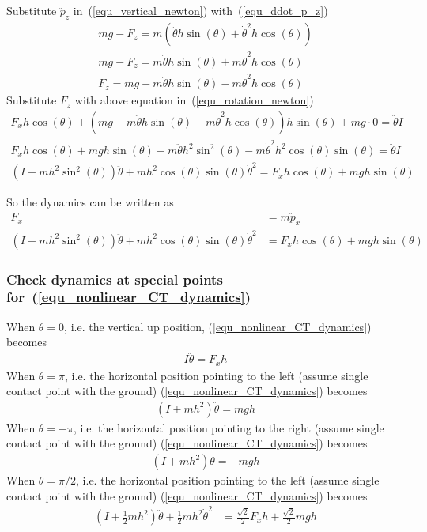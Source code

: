 \documentclass[12pt]{article}
\begin{document}
Substitute $\ddot{p}_z$ in~(\ref{equ_vertical_newton}) 
with~(\ref{equ_ddot_p_z})
\begin{align}
mg-F_z = m(\ddot{\theta}h\sin(\theta) + \dot{\theta}^2h\cos(\theta)) \\
mg-F_z = m\ddot{\theta}h\sin(\theta) + m\dot{\theta}^2h\cos(\theta) \\
F_z = mg - m\ddot{\theta}h\sin(\theta) - m\dot{\theta}^2h\cos(\theta)
\end{align}
Substitute $F_z$ with above equation in~(\ref{equ_rotation_newton})
\begin{align}
F_xh\cos(\theta) + (mg - m\ddot{\theta}h\sin(\theta) 
- m\dot{\theta}^2h\cos(\theta))h\sin(\theta) + mg\cdot 0= \ddot{\theta}I\\
F_xh\cos(\theta) + mgh\sin(\theta) - m\ddot{\theta}h^2\sin^2(\theta) 
- m\dot{\theta}^2h^2\cos(\theta)\sin(\theta) = \ddot{\theta}I \\
(I+mh^2\sin^2(\theta))\ddot{\theta}+mh^2\cos(\theta)\sin(\theta)\dot{\theta}^2
=F_xh\cos(\theta) + mgh\sin(\theta)
\end{align}

So the dynamics can be written as 
\begin{align}
F_x &= m\ddot{p}_x \\
(I+mh^2\sin^2(\theta))\ddot{\theta}+mh^2\cos(\theta)\sin(\theta)\dot{\theta}^2
&= F_xh\cos(\theta) + mgh\sin(\theta)
\label{equ_nonlinear_CT_dynamics}
\end{align}

\subsubsection{Check dynamics at special points 
for~(\ref{equ_nonlinear_CT_dynamics})}
When $\theta=0$, i.e. the vertical up position,
(\ref{equ_nonlinear_CT_dynamics}) becomes
\begin{align}
I\ddot{\theta} = F_xh
\end{align}
When $\theta=\pi$, i.e. the horizontal position pointing to the left
(assume single contact point with the ground)
(\ref{equ_nonlinear_CT_dynamics}) becomes
\begin{align}
(I+mh^2)\ddot{\theta} = mgh
\end{align}
When $\theta=-\pi$, i.e. the horizontal position pointing to the right
(assume single contact point with the ground)
(\ref{equ_nonlinear_CT_dynamics}) becomes
\begin{align}
(I+mh^2)\ddot{\theta} = -mgh
\end{align}
When $\theta=\pi/2$, i.e. the horizontal position pointing to the left
(assume single contact point with the ground)
(\ref{equ_nonlinear_CT_dynamics}) becomes
\begin{align}
(I+\frac{1}{2}mh^2)\ddot{\theta}+\frac{1}{2}mh^2\dot{\theta}^2
&= \frac{\sqrt{2}}{2}F_xh + \frac{\sqrt{2}}{2}mgh
\end{align}
\end{document}
